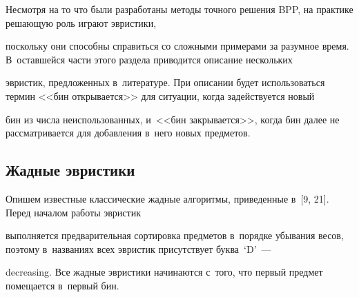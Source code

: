Несмотря на то что были разработаны методы точ\-но\-го решения BPP, на практике ре\-ша\-ющую роль играют эвристики, 

поскольку они способны справиться со слож\-ны\-ми примерами за разумное время. В~оставшейся час\-ти этого раздела приводится описание нескольких 

эвристик, предложенных в~литературе. При описании будет использоваться термин <<бин открывается>> для ситуации, когда задействуется новый 

бин из чис\-ла неиспользованных, и~<<бин за\-кры\-ва\-ет\-ся>>, когда бин далее не рас\-смат\-ри\-ва\-ет\-ся для до\-бав\-ле\-ния в~него новых пред\-метов.



\subsection{Жадные эвристики}



Опишем известные классические жад\-ные алгоритмы, приведенные в~[9, 21]. Перед началом работы эвристик 

выполняется предварительная сортировка пред\-ме\-тов в~порядке убывания весов, поэтому в~на\-зва\-ни\-ях всех эвристик присутствует буква~`D'~--- 

decreasing. Все жад\-ные эвристики начинаются с~того, что пер\-вый предмет помещается в~первый бин.



